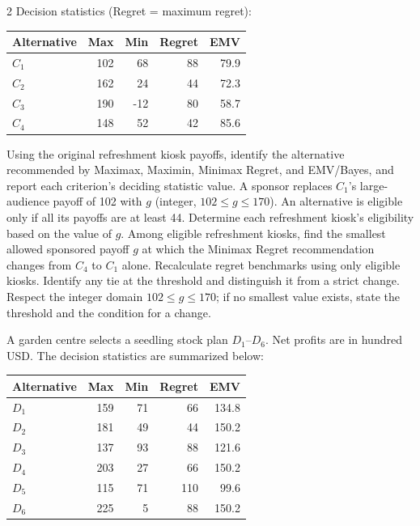 \begin{multicols}{2}
Decision statistics (Regret = maximum regret):

\begin{center}\small\setlength{\tabcolsep}{4pt}
	\begin{tabular}{lrrrr}\toprule
		Alternative & Max & Min & Regret & EMV\\ \midrule
				$C_1$ & 102 & 68 & 88 & 79.9\\
		$C_2$ & 162 & 24 & 44 & 72.3\\
		$C_3$ & 190 & -12 & 80 & 58.7\\
		$C_4$ & 148 & 52 & 42 & 85.6\\
		\bottomrule
	\end{tabular}
\end{center}

\noindent Using the original refreshment kiosk payoffs, identify the alternative recommended by Maximax, Maximin, Minimax Regret, and EMV/Bayes, and report each criterion's deciding statistic value.  A sponsor replaces $C_1$'s large-audience payoff of 102 with $g$ (integer, $102\leq g\leq170$). An alternative is eligible only if all its payoffs are at least 44. Determine each refreshment kiosk's eligibility based on the value of $g$.  Among eligible refreshment kiosks, find the smallest allowed sponsored payoff $g$ at which the Minimax Regret recommendation changes from $C_4$ to $C_1$ alone. Recalculate regret benchmarks using only eligible kiosks. Identify any tie at the threshold and distinguish it from a strict change. Respect the integer domain $102\leq g\leq170$; if no smallest value exists, state the threshold and the condition for a change. 

A garden centre selects a seedling stock plan $D_1$--$D_6$. Net profits are in hundred USD. The decision statistics are summarized below:

\vspace{-3mm}
\begin{center}\small\setlength{\tabcolsep}{4pt}
	\begin{tabular}{lrrrr}\toprule
		Alternative & Max & Min & Regret & EMV\\ \midrule
		$D_1$ & 159 & 71 & 66 & 134.8\\
		$D_2$ & 181 & 49 & 44 & 150.2\\
		$D_3$ & 137 & 93 & 88 & 121.6\\
		$D_4$ & 203 & 27 & 66 & 150.2\\
		$D_5$ & 115 & 71 & 110 & 99.6\\
		$D_6$ & 225 & 5 & 88 & 150.2\\
		\bottomrule
	\end{tabular}
\end{center}
\vspace{-3mm}


\end{multicols}
